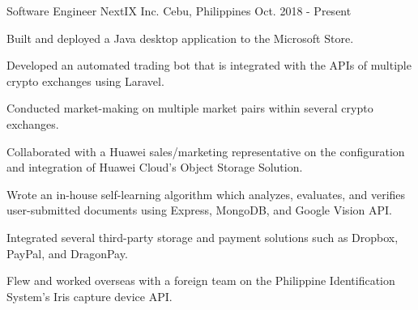 

\begin{cventries}

  \cventry
    {Software Engineer} %
    {NextIX Inc.} %
    {Cebu, Philippines} %
    {Oct. 2018 - Present} %
    {
      \begin{cvitems} %
        \item {Built and deployed a Java desktop application to the Microsoft Store.}
        \item {Developed an automated trading bot that is integrated with the APIs of multiple crypto exchanges using Laravel.}
        \item {Conducted market-making on multiple market pairs within several crypto exchanges.}
        \item {Collaborated with a Huawei sales/marketing representative on the configuration and integration of Huawei Cloud's Object Storage Solution.}
        \item {Wrote an in-house self-learning algorithm which analyzes, evaluates, and verifies user-submitted documents using Express, MongoDB, and Google Vision API.}
        \item {Integrated several third-party storage and payment solutions such as Dropbox, PayPal, and DragonPay.}
        \item {Flew and worked overseas with a foreign team on the Philippine Identification System's Iris capture device API.}
      \end{cvitems}
    }
\end{cventries}
